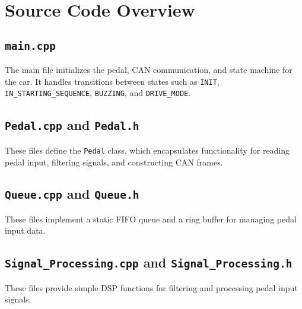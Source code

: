 \documentclass[a4paper,12pt]{article}
\begin{document}
\section{Source Code Overview}
\subsection{\texttt{main.cpp}}
The main file initializes the pedal, CAN communication, and state machine for the car. It handles transitions between states such as \texttt{INIT}, \texttt{IN\_STARTING\_SEQUENCE}, \texttt{BUZZING}, and \texttt{DRIVE\_MODE}.



\subsection{\texttt{Pedal.cpp} and \texttt{Pedal.h}}
These files define the \texttt{Pedal} class, which encapsulates functionality for reading pedal input, filtering signals, and constructing CAN frames.





\subsection{\texttt{Queue.cpp} and \texttt{Queue.h}}
These files implement a static FIFO queue and a ring buffer for managing pedal input data.





\subsection{\texttt{Signal\_Processing.cpp} and \texttt{Signal\_Processing.h}}
These files provide simple DSP functions for filtering and processing pedal input signals.


\end{document}
